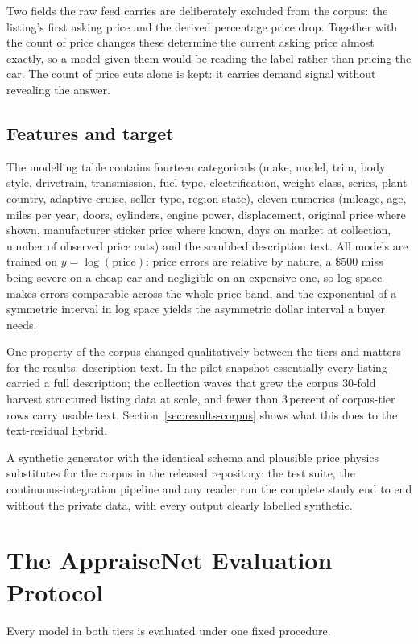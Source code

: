 \documentclass[journal,10pt]{IEEEtran}
\begin{document}
Two fields the raw feed carries are deliberately excluded from the corpus: the listing's first asking price and the derived percentage price drop. Together with the count of price changes these determine the current asking price almost exactly, so a model given them would be reading the label rather than pricing the car. The count of price cuts alone is kept: it carries demand signal without revealing the answer.

\subsection{Features and target}
The modelling table contains fourteen categoricals (make, model, trim, body style, drivetrain, transmission, fuel type, electrification, weight class, series, plant country, adaptive cruise, seller type, region state), eleven numerics (mileage, age, miles per year, doors, cylinders, engine power, displacement, original price where shown, manufacturer sticker price where known, days on market at collection, number of observed price cuts) and the scrubbed description text. All models are trained on $y=\log(\text{price})$: price errors are relative by nature, a \$500 miss being severe on a cheap car and negligible on an expensive one, so log space makes errors comparable across the whole price band, and the exponential of a symmetric interval in log space yields the asymmetric dollar interval a buyer needs.

One property of the corpus changed qualitatively between the tiers and matters for the results: description text. In the pilot snapshot essentially every listing carried a full description; the collection waves that grew the corpus 30-fold harvest structured listing data at scale, and fewer than 3\,percent of corpus-tier rows carry usable text. Section~\ref{sec:results-corpus} shows what this does to the text-residual hybrid.

A synthetic generator with the identical schema and plausible price physics substitutes for the corpus in the released repository: the test suite, the continuous-integration pipeline and any reader run the complete study end to end without the private data, with every output clearly labelled synthetic.

\section{The AppraiseNet Evaluation Protocol}
\label{sec:protocol}
Every model in both tiers is evaluated under one fixed procedure.
\end{document}

